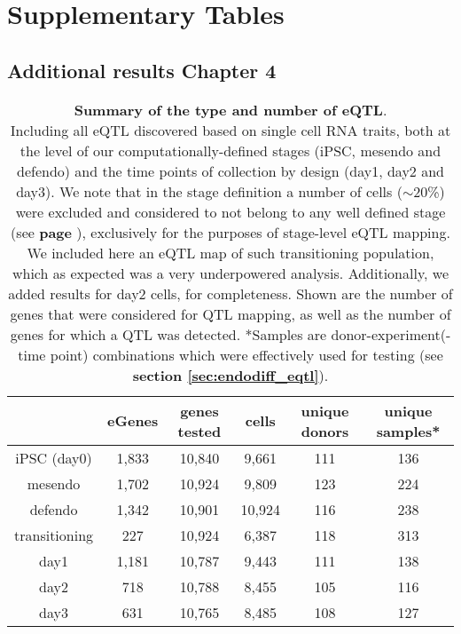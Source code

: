 \chapter{Supplementary Tables} 



\section{Additional results Chapter 4}

\begin{table}[h]
    \centering
    \begin{tabular}{c | c c c c c}
     & eGenes & genes tested & cells & unique donors & unique samples*  \\
    \hline
    iPSC (day0) & 1,833 & 10,840 & 9,661 & 111 & 136 \\
    mesendo & 1,702 & 10,924 & 9,809 & 123 & 224 \\
    defendo & 1,342 & 10,901 & 10,924 & 116 & 238\\
    transitioning & 227 & 10,924 & 6,387 & 118 & 313 \\
    day1 & 1,181 & 10,787 & 9,443 & 111 & 138 \\
    day2 & 718 & 10,788 & 8,455 & 105 & 116 \\
    day3 & 631 & 10,765 & 8,485 & 108 & 127 \\
    \end{tabular}
    \caption[Summary of the type and number of eQTL]{\textbf{Summary of the type and number of eQTL}.\\
    Including all eQTL discovered based on single cell RNA traits, both at the level of our computationally-defined stages (iPSC, mesendo and defendo) and the time points of collection by design (day1, day2 and day3).
    We note that in the stage definition a number of cells ($\sim$20\%) were excluded and considered to not belong to any well defined stage (see \textbf{page \pageref{fig:endodiff_stages}}), exclusively for the purposes of stage-level eQTL mapping.
    We included here an eQTL map of such transitioning population, which as expected was a very underpowered analysis.
    Additionally, we added results for day2 cells, for completeness.
    Shown are the number of genes that were considered for QTL mapping, as well as the number of genes for which a QTL was detected.
    *Samples are donor-experiment(-time point) combinations which were effectively used for testing (see \textbf{section \ref{sec:endodiff_eqtl}}).}
    \label{tab:endodiff_eqtl_summary}
\end{table}


